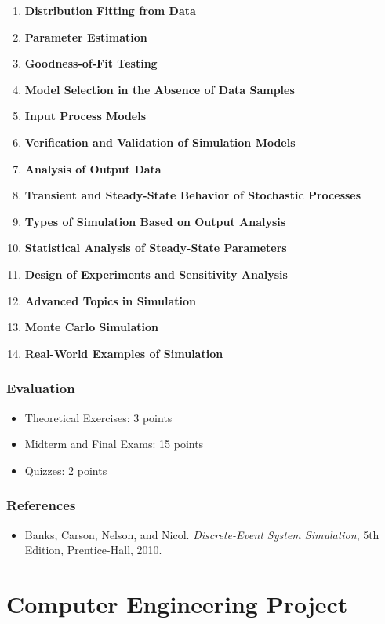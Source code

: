 \documentclass[12pt]{article}
\begin{document}
\begin{enumerate}
    \item \textbf{Distribution Fitting from Data}
    \item \textbf{Parameter Estimation}
    \item \textbf{Goodness-of-Fit Testing}
    \item \textbf{Model Selection in the Absence of Data Samples}
    \item \textbf{Input Process Models}
    \item \textbf{Verification and Validation of Simulation Models}
    \item \textbf{Analysis of Output Data}
    \item \textbf{Transient and Steady-State Behavior of Stochastic Processes}
    \item \textbf{Types of Simulation Based on Output Analysis}
    \item \textbf{Statistical Analysis of Steady-State Parameters}
    \item \textbf{Design of Experiments and Sensitivity Analysis}
    \item \textbf{Advanced Topics in Simulation}
    \item \textbf{Monte Carlo Simulation}
    \item \textbf{Real-World Examples of Simulation}
\end{enumerate}

\subsubsection*{Evaluation}
\begin{itemize}
    \item Theoretical Exercises: 3 points
    \item Midterm and Final Exams: 15 points
    \item Quizzes: 2 points
\end{itemize}

\subsubsection*{References}
\begin{itemize}
    \item Banks, Carson, Nelson, and Nicol. \textit{Discrete-Event System Simulation}, 5th Edition, Prentice-Hall, 2010.
\end{itemize}

\newpage

\section{Computer Engineering Project}
\end{document}
